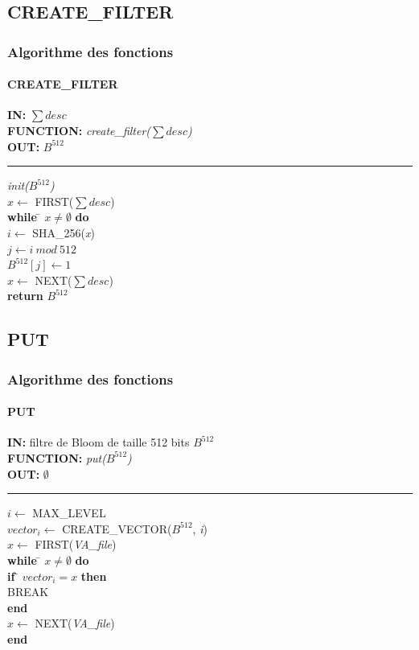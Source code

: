\documentclass[hyperref={pdfpagemode=FullScreen,colorlinks=true},xcolor=pst,dvips]{beamer}\usepackage[french]{babel}
\begin{document}
	\subsection{CREATE\_FILTER}
	\begin{frame}[shrink]
		\frametitle{Algorithme des fonctions}
		\framesubtitle{CREATE\_FILTER}
		\begin{framed}
		\textbf{IN:} $\sum desc$\\
		\textbf{FUNCTION:} \textit{create\_filter($\sum desc$)}\\
		\textbf{OUT:} \textit{$B^{512}$}\\

		\noindent\rule{\linewidth}{0.5pt}

		\begin{tabbing}
			\textit{init($B^{512}$)}\\
			$x \leftarrow$ FIRST($\sum desc$)\\
			\textbf{while} \= $x \neq \emptyset$ \textbf{do}\\
					\> $i \leftarrow$ SHA\_256(\textit{x})\\
					\> $j \leftarrow i\ mod\ 512$\\
					\> $B^{512}[j]\leftarrow 1$\\
					\> $x \leftarrow$ NEXT($\sum desc$)\\
			\textbf{return} $B^{512}$\\
	    	\end{tabbing}		
	\end{framed}
	\end{frame}
	
	\subsection{PUT}
	\begin{frame}[shrink]
		\frametitle{Algorithme des fonctions}
		\framesubtitle{PUT}
		\begin{framed}
		\textbf{IN:} filtre de Bloom de taille 512 bits $B^{512}$\\
		\textbf{FUNCTION:} \textit{put($B^{512}$)}\\
		\textbf{OUT:} \textit{$\emptyset$}\\

		\noindent\rule{\linewidth}{0.5pt}

		\begin{tabbing}
			$i \leftarrow$ MAX\_LEVEL\\
			$vector_i \leftarrow$ CREATE\_VECTOR($B^{512}$, \textit{i})\\
			$x \leftarrow$ FIRST(\textit{VA\_file})\\
			\textbf{while }\= $x \neq \emptyset$ \textbf{do}\\
					\> \textbf{if }\= $vector_i = x$\textbf{ then}\\
					\> \> BREAK\\
					\> \textbf{end}\\
					\> $x \leftarrow$ NEXT(\textit{VA\_file})\\
			\textbf{end}	\\	
	    	\end{tabbing}		
	\end{framed}
	\end{frame}
	
\end{document}
